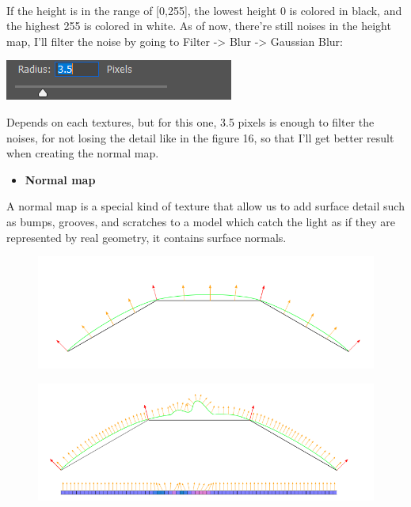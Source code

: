 \documentclass[a4paper, 13pt]{extarticle}
\begin{document}
  \\[0.2cm]
  If the height is in the range of [0,255], the lowest height 0 is colored in black, and the highest 255 is colored in white. As of now, there're still noises in the height map, I'll filter the noise by going to Filter -> Blur -> Gaussian Blur: \begin{minipage}{0.21\textwidth}
  	\includegraphics[width=\linewidth]{intructions/guassian_blur.png}
  \end{minipage}  Depends on each textures, but for this one, 3.5 pixels is enough to filter the noises, for not losing the detail like in the figure 16, so that I'll get better result when creating the normal map.  
\begin{itemize}
	\item \bfseries Normal map	 	
\end{itemize}
  A normal map is a special kind of texture that allow us to add surface detail such as bumps, grooves, and scratches to a model which catch the light as if they are represented by real geometry, it contains surface normals. 
  \begin{figure}[h]
  	\begin{minipage}{.45\textwidth}
  		\centering
  		\includegraphics[width=1\linewidth]{intructions/surface_normal.png}
  		\centering
  		\label{fig:test18}
  	\end{minipage}
  	\begin{minipage}{.4\textwidth}
  		\centering
  		\includegraphics[width=1.6\linewidth]{intructions/surface_normal_across.png}
  		\centering
  		\label{fig:test179}
  	\end{minipage}
  \end{figure}
\end{document}
